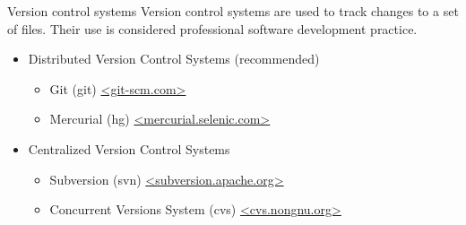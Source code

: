 \begin{block}{Version control systems}
  Version control systems are used to track changes to a set of files. Their use is considered professional software development practice.
  \begin{itemize}
  \item Distributed Version Control Systems (recommended)
    \begin{itemize}
    \item Git (git) \url{<git-scm.com>}
    \item Mercurial (hg) \url{<mercurial.selenic.com>}
    \end{itemize}
  \item Centralized Version Control Systems
    \begin{itemize}
    \item Subversion (svn) \url{<subversion.apache.org>}
    \item Concurrent Versions System (cvs) \url{<cvs.nongnu.org>}
    \end{itemize}
  \end{itemize}
\end{block}
